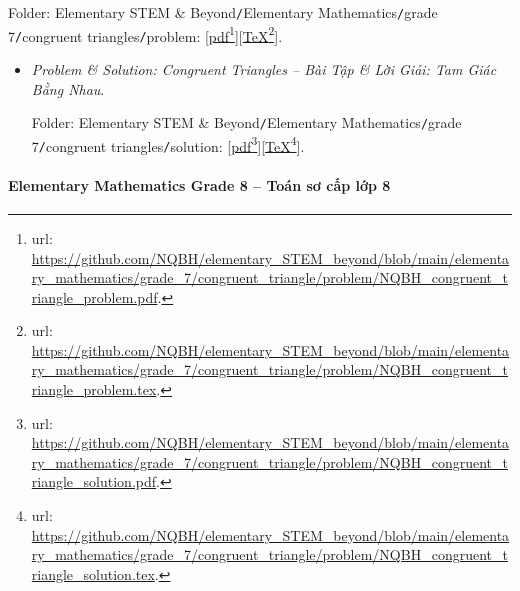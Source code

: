 \documentclass[12pt]{article}
\begin{document}
\begin{itemize}
	Folder: {\sf Elementary STEM \& Beyond{\tt/}Elementary Mathematics{\tt/}grade 7{\tt/}congruent triangles{\tt/}problem}: [\href{https://github.com/NQBH/elementary_STEM_beyond/blob/main/elementary_mathematics/grade_7/congruent_triangle/problem/NQBH_congruent_triangle_problem.pdf}{pdf}\footnote{{\sc url}: \url{https://github.com/NQBH/elementary_STEM_beyond/blob/main/elementary_mathematics/grade_7/congruent_triangle/problem/NQBH_congruent_triangle_problem.pdf}.}][\href{https://github.com/NQBH/elementary_STEM_beyond/blob/main/elementary_mathematics/grade_7/congruent_triangle/problem/NQBH_congruent_triangle_problem.tex}{\TeX}\footnote{{\sc url}: \url{https://github.com/NQBH/elementary_STEM_beyond/blob/main/elementary_mathematics/grade_7/congruent_triangle/problem/NQBH_congruent_triangle_problem.tex}.}].
	\begin{itemize}
		\item {\it Problem \& Solution: Congruent Triangles -- Bài Tập \& Lời Giải: Tam Giác Bằng Nhau}.
		
		Folder: {\sf Elementary STEM \& Beyond{\tt/}Elementary Mathematics{\tt/}grade 7{\tt/}congruent triangles{\tt/}solution}: [\href{https://github.com/NQBH/elementary_STEM_beyond/blob/main/elementary_mathematics/grade_7/congruent_triangle/problem/NQBH_congruent_triangle_solution.pdf}{pdf}\footnote{{\sc url}: \url{https://github.com/NQBH/elementary_STEM_beyond/blob/main/elementary_mathematics/grade_7/congruent_triangle/problem/NQBH_congruent_triangle_solution.pdf}.}][\href{https://github.com/NQBH/elementary_STEM_beyond/blob/main/elementary_mathematics/grade_7/congruent_triangle/problem/NQBH_congruent_triangle_solution.tex}{\TeX}\footnote{{\sc url}: \url{https://github.com/NQBH/elementary_STEM_beyond/blob/main/elementary_mathematics/grade_7/congruent_triangle/problem/NQBH_congruent_triangle_solution.tex}.}].
	\end{itemize}
\end{itemize}

\paragraph{Elementary Mathematics Grade 8 -- Toán sơ cấp lớp 8}
\end{document}
